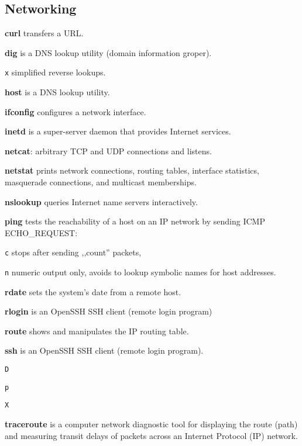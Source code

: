 \subsection{Networking}
\textbf{curl} transfers a URL.

\textbf{dig} is a DNS lookup utility (domain information groper).
\begin{enumx}
	\item [\texttt{x}] simplified reverse lookups.
\end{enumx}

\textbf{host} is a DNS lookup utility.

\textbf{ifconfig} configures a network interface.

\textbf{inetd} is a super-server daemon that provides Internet services.

\textbf{netcat}: arbitrary TCP and UDP connections and listens.

\textbf{netstat} prints network connections, routing tables, 
interface statistics, masquerade connections, and multicast memberships.

\textbf{nslookup} queries Internet name servers interactively.

\textbf{ping} tests the reachability of a host 
on an IP network by sending ICMP ECHO\_REQUEST:
\begin{enumx}
	\item [\texttt{c}] stops after sending ,,count'' packets,
	\item [\texttt{n}] numeric output only, 
	avoids to lookup symbolic names for host addresses. 
\end{enumx}

\textbf{rdate} sets the system's date from a remote host.

\textbf{rlogin} is an OpenSSH SSH client (remote login program)

\textbf{route} shows and manipulates the IP routing table.

\textbf{ssh} is an OpenSSH SSH client (remote login program).
\begin{enumx}
	\item [\texttt{D}]
	\item [\texttt{p}]
	\item [\texttt{X}]
\end{enumx}

\textbf{traceroute} is a computer network diagnostic tool for 
displaying the route (path) and measuring transit delays of 
packets across an Internet Protocol (IP) network.

